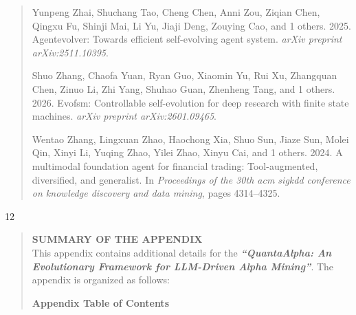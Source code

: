 \documentclass[
]{article}
\begin{document}
\begin{quote}
Yunpeng Zhai, Shuchang Tao, Cheng Chen, Anni Zou, Ziqian Chen, Qingxu
Fu, Shinji Mai, Li Yu, Jiaji Deng, Zouying Cao, and 1 others. 2025.
Agentevolver: Towards efficient self-evolving agent system. \emph{arXiv
preprint arXiv:2511.10395}.

Shuo Zhang, Chaofa Yuan, Ryan Guo, Xiaomin Yu, Rui Xu, Zhangquan Chen,
Zinuo Li, Zhi Yang, Shuhao Guan, Zhenheng Tang, and 1 others. 2026.
Evofsm: Controllable self-evolution for deep research with finite state
machines. \emph{arXiv preprint arXiv:2601.09465}.

Wentao Zhang, Lingxuan Zhao, Haochong Xia, Shuo Sun, Jiaze Sun, Molei
Qin, Xinyi Li, Yuqing Zhao, Yilei Zhao, Xinyu Cai, and 1 others. 2024. A
multimodal foundation agent for financial trading: Tool-augmented,
diversified, and generalist. In \emph{Proceedings of the 30th acm sigkdd
conference on knowledge discovery and data mining}, pages 4314--4325.
\end{quote}

12

\begin{quote}
\textbf{SUMMARY OF THE APPENDIX}\\
This appendix contains additional details for the
\emph{\textbf{``QuantaAlpha: An Evolutionary Framework for LLM-Driven
Alpha Mining''}}. The appendix is organized as follows:

\textbf{Appendix Table of Contents}
\end{quote}
\end{document}
